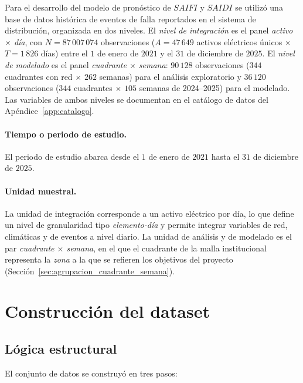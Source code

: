 Para el desarrollo del modelo de pronóstico de $SAIFI$ y $SAIDI$ se utilizó una base de datos histórica de eventos de falla reportados en el sistema de distribución, organizada en dos niveles. El \textit{nivel de integración} es el panel \textit{activo $\times$ día}, con $N = 87\,007\,074$ observaciones ($A = 47\,649$ activos eléctricos únicos $\times$ $T = 1\,826$ días) entre el $1$ de enero de $2021$ y el $31$ de diciembre de $2025$. El \textit{nivel de modelado} es el panel \textit{cuadrante $\times$ semana}: $90\,128$ observaciones ($344$ cuadrantes con red $\times$ $262$ semanas) para el análisis exploratorio y $36\,120$ observaciones ($344$ cuadrantes $\times$ $105$ semanas de 2024--2025) para el modelado. Las variables de ambos niveles se documentan en el catálogo de datos del Apéndice~\ref{app:catalogo}.

\paragraph{Tiempo o periodo de estudio.}
El periodo de estudio abarca desde el $1$ de enero de $2021$ hasta el $31$ de diciembre de $2025$.

\paragraph{Unidad muestral.}
La unidad de integración corresponde a un activo eléctrico por día, lo que define un nivel de granularidad tipo \textit{elemento-día} y permite integrar variables de red, climáticas y de eventos a nivel diario. La unidad de análisis y de modelado es el par \textit{cuadrante $\times$ semana}, en el que el cuadrante de la malla institucional representa la \textit{zona} a la que se refieren los objetivos del proyecto (Sección~\ref{sec:agrupacion_cuadrante_semana}).

\section{Construcción del dataset}

\subsection{Lógica estructural}

El conjunto de datos se construyó en tres pasos:

